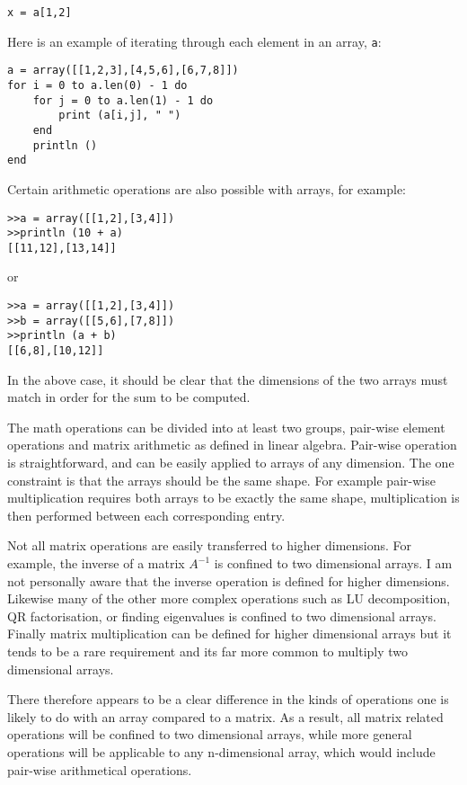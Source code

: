 \begin{lstlisting}
x = a[1,2]
\end{lstlisting}

Here is an example of iterating through each element in an array, {\tt a}:

\begin{lstlisting}
a = array([[1,2,3],[4,5,6],[6,7,8]])
for i = 0 to a.len(0) - 1 do
    for j = 0 to a.len(1) - 1 do
        print (a[i,j], " ")
    end
    println ()
end
\end{lstlisting}

Certain arithmetic operations are also possible with arrays, for example:

\begin{lstlisting}
>>a = array([[1,2],[3,4]])
>>println (10 + a)
[[11,12],[13,14]]
\end{lstlisting}

or

\begin{lstlisting}
>>a = array([[1,2],[3,4]])
>>b = array([[5,6],[7,8]])
>>println (a + b)
[[6,8],[10,12]]
\end{lstlisting}

In the above case, it should be clear that the dimensions of the two arrays must match in order for the sum to be computed.

The math operations can be divided into at least two groups, pair-wise element operations and matrix arithmetic as defined in linear algebra. Pair-wise operation is straightforward, and can be easily applied to arrays of any dimension. The one constraint is that the arrays should be the same shape. For example pair-wise multiplication requires both arrays to be exactly the same shape, multiplication is then performed between each corresponding entry.

Not all matrix operations are easily transferred to higher dimensions. For example, the inverse of a matrix $A^{-1}$ is confined to two dimensional arrays. I am not personally aware that the inverse operation is defined for higher dimensions. Likewise many of the other more complex operations such as LU decomposition, QR factorisation, or finding eigenvalues is confined to two dimensional arrays. Finally matrix multiplication can be defined for higher dimensional arrays but it tends to be a rare requirement and its far more common to multiply two dimensional arrays.

There therefore appears to be a clear difference in the kinds of operations one is likely to do with an array compared to a matrix. As a result, all matrix related operations will be confined to two dimensional arrays, while more general operations will be applicable to any n-dimensional array, which would include pair-wise arithmetical operations.

